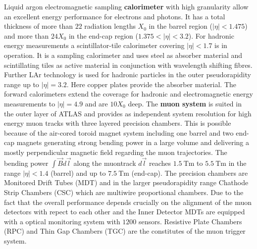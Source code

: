 Liquid argon electromagnetic sampling \textbf{calorimeter} with high granularity allow an excellent energy performance for electrons and photons. It has a total thickness of more than $22$ radiation lengths $X_0$ in the barrel region ($|\eta|<1.475$) and more than $24X_0$ in the end-cap region ($1.375<|\eta|<3.2$). For hadronic energy measurements a scintillator-tile calorimeter covering $|\eta|<1.7$ is in operation. It is a sampling calorimeter and uses steel as absorber material and scintillating tiles as active material in conjunction with wavelength shifting fibres. Further LAr technology is used for hadronic particles in the outer pseudorapidity range up to $|\eta|=3.2$. Here copper plates provide the absorber material. The forward calorimeters extend the coverage for hadronic and electromagnetic energy measurements to $|\eta|=4.9$ and are $10X_0$ deep. \cite{ATLASJINST}\newline%
The \textbf{muon system} is suited in the outer layer of ATLAS and provides as independent system resolution for high energy muon tracks with three layered precision chambers. This is possible because of the air-cored toroid magnet system including one barrel and two end-cap magnets generating strong bending power in a large volume and delivering  a mostly perpendicular magnetic field regarding the muon trajectories. The bending power $\int{\vec{B}d\vec{l}}$ along the muontrack $d\vec{l}$ reaches $\SI{1.5}{\tesla\meter}$ to $\SI{5.5}{\tesla\meter}$ in the range $|\eta|<1.4$ (barrel) and up to $\SI{7.5}{\tesla\meter}$ (end-cap). The precision chambers are Monitored Drift Tubes (MDT) and in the larger pseudorapidity range Chathode Strip Chambers (CSC) which are multiwire proportional chambers. Due to the fact that the overall performance depends crucially on the alignment of the muon detectors with repect to each other and the Inner Detector MDTs are equipped with a optical monitoring system with $1200$ sensors. Resistive Plate Chambers (RPC) and Thin Gap Chambers (TGC) are the constitutes of the muon trigger system. \cite{ATLASJINST} \newline %
